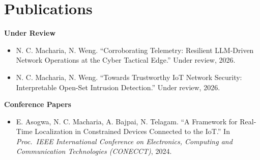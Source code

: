 \documentclass[10.5pt,letterpaper]{article}
\begin{document}
\section*{Publications}
\textbf{Under Review}
\begin{itemize}
  \item N. C. Macharia, N. Weng. ``Corroborating Telemetry: Resilient LLM-Driven Network
        Operations at the Cyber Tactical Edge.'' Under review, 2026.
  \item N. C. Macharia, N. Weng. ``Towards Trustworthy IoT Network Security: Interpretable
        Open-Set Intrusion Detection.'' Under review, 2026.
\end{itemize}
\vspace{0.3em}
\textbf{Conference Papers}
\begin{itemize}
  \item E. Asogwa, N. C. Macharia, A. Bajpai, N. Telagam. ``A Framework for Real-Time Localization
        in Constrained Devices Connected to the IoT.'' In \textit{Proc.\ IEEE International Conference
        on Electronics, Computing and Communication Technologies (CONECCT)}, 2024.
\end{itemize}

\end{document}
